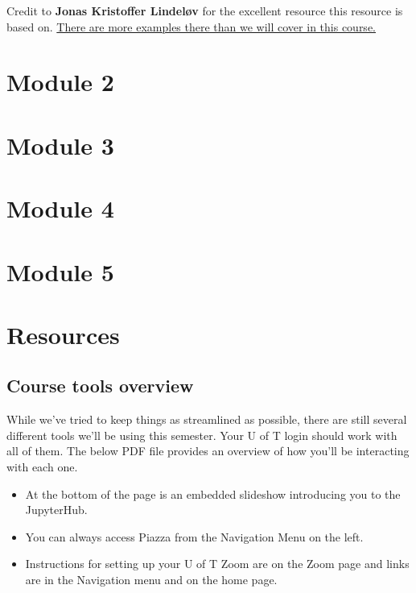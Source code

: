 \documentclass[
]{book}
\providecommand{\tightlist}{%
  \setlength{\itemsep}{0pt}\setlength{\parskip}{0pt}}
\begin{document}
Credit to \textbf{Jonas Kristoffer Lindeløv} for the excellent resource this resource is based on. \href{https://lindeloev.github.io/tests-as-linear/}{There are more examples there than we will cover in this course.}

\hypertarget{module-2}{%
\chapter{Module 2}\label{module-2}}

\hypertarget{module-3}{%
\chapter{Module 3}\label{module-3}}

\hypertarget{module-4}{%
\chapter{Module 4}\label{module-4}}

\hypertarget{module-5}{%
\chapter{Module 5}\label{module-5}}

\hypertarget{resources}{%
\chapter{Resources}\label{resources}}

\hypertarget{course-tools-overview}{%
\section{Course tools overview}\label{course-tools-overview}}

While we've tried to keep things as streamlined as possible, there are still several different tools we'll be using this semester. Your U of T login should work with all of them. The below PDF file provides an overview of how you'll be interacting with each one.

\begin{itemize}
\tightlist
\item
  At the bottom of the page is an embedded slideshow introducing you to the JupyterHub.\\
\item
  You can always access Piazza from the Navigation Menu on the left.\\
\item
  Instructions for setting up your U of T Zoom are on the Zoom page and links are in the Navigation menu and on the home page.
\end{itemize}
\end{document}
